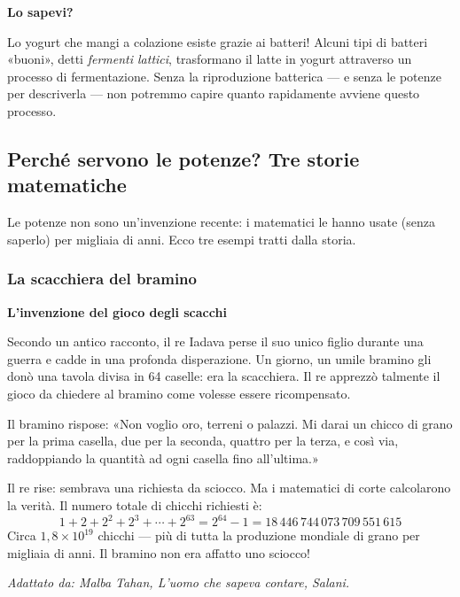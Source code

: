 \begin{sapevi}
  \textbf{Lo sapevi?}

  Lo yogurt che mangi a colazione esiste grazie ai batteri! Alcuni tipi di batteri
  «buoni», detti \textit{fermenti lattici}, trasformano il latte in yogurt attraverso
  un processo di fermentazione. Senza la riproduzione batterica — e senza le potenze
  per descriverla — non potremmo capire quanto rapidamente avviene questo processo.
\end{sapevi}

\subsection{Perché servono le potenze? Tre storie matematiche}

Le potenze non sono un'invenzione recente: i matematici le hanno usate (senza
saperlo) per migliaia di anni. Ecco tre esempi tratti dalla storia.

\subsubsection*{La scacchiera del bramino}

\begin{sapevi}
  \textbf{L'invenzione del gioco degli scacchi}

  Secondo un antico racconto, il re Iadava perse il suo unico figlio durante una guerra
  e cadde in una profonda disperazione. Un giorno, un umile bramino gli donò una tavola
  divisa in 64 caselle: era la scacchiera. Il re apprezzò talmente il gioco da chiedere
  al bramino come volesse essere ricompensato.

  Il bramino rispose: «Non voglio oro, terreni o palazzi. Mi darai un chicco di grano
  per la prima casella, due per la seconda, quattro per la terza, e così via,
  raddoppiando la quantità ad ogni casella fino all'ultima.»

  Il re rise: sembrava una richiesta da sciocco. Ma i matematici di corte calcolarono
  la verità. Il numero totale di chicchi richiesti è:
  \[
    1 + 2 + 2^2 + 2^3 + \cdots + 2^{63} = 2^{64} - 1 = 18\,446\,744\,073\,709\,551\,615
  \]
  Circa $1{,}8 \times 10^{19}$ chicchi — più di tutta la produzione mondiale di grano
  per migliaia di anni. Il bramino non era affatto uno sciocco!

  \textit{Adattato da: Malba Tahan, \textup{L'uomo che sapeva contare}, Salani.}
\end{sapevi}

